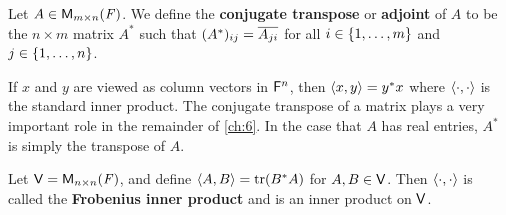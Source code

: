 \begin{defn}\label{6.1.5}
	Let \(A \in \ms\).
	We define the \textbf{conjugate transpose} or \textbf{adjoint} of \(A\) to be the \(n \times m\) matrix \(A^*\) such that \((A^*)_{i j} = \overline{A_{j i}}\) for all \(i \in \left\lbrace1, \dots, m\right\rbrace\) and \(j \in \left\lbrace1, \dots, n\right\rbrace\).
\end{defn}

\begin{note}
	If \(x\) and \(y\) are viewed as column vectors in \(\mathsf{F}^n\), then \(\left\langle x, y\right\rangle = y^* x\) where \(\left\langle\cdot, \cdot\right\rangle\) is the standard inner product.
	The conjugate transpose of a matrix plays a very important role in the remainder of \cref{ch:6}.
	In the case that \(A\) has real entries, \(A^*\) is simply the transpose of \(A\).
\end{note}

\begin{eg}\label{6.1.6}
	Let \(\V = \ms[n][n][\F]\), and define \(\inn{A, B} = \tr(B^* A)\) for \(A, B \in \mathsf{V}\).
	Then \(\left\langle\cdot, \cdot\right\rangle\) is called the \textbf{Frobenius inner product} and is an inner product on \(\mathsf{V}\).
\end{eg}


